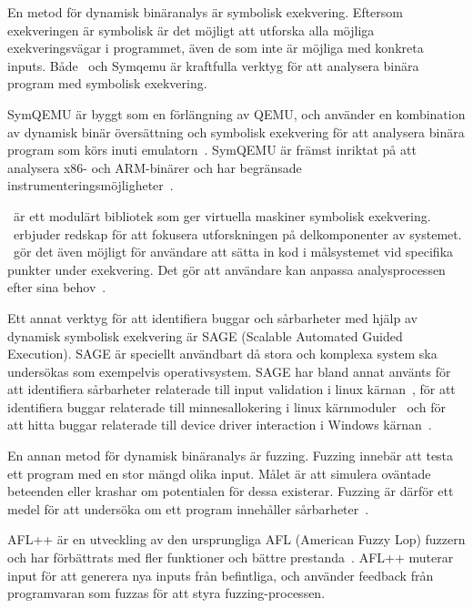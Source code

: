 En metod för dynamisk binäranalys är symbolisk exekvering. Eftersom exekveringen är symbolisk är 
det möjligt att utforska alla möjliga exekveringsvägar i programmet, även de som inte är möjliga
med konkreta inputs. Både \stoe\ och Symqemu är kraftfulla verktyg för att analysera binära program 
med symbolisk exekvering.

SymQEMU är byggt som en förlängning av QEMU, och använder en kombination av dynamisk binär 
översättning och symbolisk exekvering för att analysera binära program som körs inuti emulatorn~\cite{symqemu}.
SymQEMU är främst inriktat på att analysera x86- och ARM-binärer och har begränsade instrumenteringsmöjligheter~\cite{Sen2016Symbolic}.

\stoe\ är ett modulärt bibliotek som ger virtuella maskiner symbolisk exekvering. \stoe\ erbjuder 
redskap för att fokusera utforskningen på delkomponenter av systemet. \stoe\ gör det även 
möjligt för användare att sätta in kod i målsystemet vid specifika punkter under 
exekvering. Det gör att användare kan anpassa analysprocessen efter sina behov~\cite{s2e}. 

Ett annat verktyg för att identifiera buggar och sårbarheter med hjälp av dynamisk symbolisk 
exekvering är SAGE (Scalable Automated Guided Execution). SAGE är speciellt användbart då 
stora och komplexa system ska undersökas som exempelvis operativsystem. SAGE har bland annat 
använts för att identifiera sårbarheter relaterade till input validation i linux kärnan~\cite{dahse},
för att identifiera buggar relaterade till minnesallokering i linux kärnmoduler~\cite{avgerinos} och 
för att hitta buggar relaterade till device driver interaction i Windows kärnan~\cite{dawson}.

En annan metod för dynamisk binäranalys är fuzzing. Fuzzing innebär att testa ett program med en 
stor mängd olika input. Målet är att simulera oväntade beteenden eller krashar om potentialen för 
dessa existerar. Fuzzing är därför ett medel för att undersöka om ett program innehåller 
sårbarheter~\cite{rawat}.

AFL++ är en utveckling av den ursprungliga AFL (American Fuzzy Lop) fuzzern och har 
förbättrats med fler funktioner och bättre prestanda~\cite{aflplusplus}. AFL++ muterar input för 
att generera nya inputs från befintliga, och använder feedback från programvaran som fuzzas för att 
styra fuzzing-processen.  

